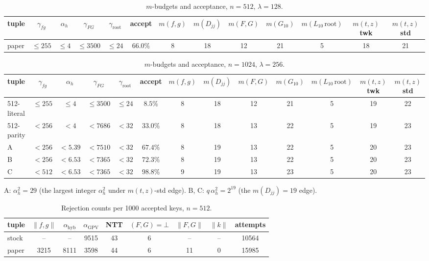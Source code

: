 \documentclass[11pt]{article}
\begin{document}
\begin{table}[h!]
\centering
\caption{$m$-budgets and acceptance, $n=512$, $\lambda=128$.}
\scriptsize\setlength{\tabcolsep}{3pt}
\begin{tabular}{lcccccccccccc}
\toprule
tuple & $\gamma_{fg}$ & $\alpha_h$ & $\gamma_{FG}$ & $\gamma_{\mathrm{root}}$
 & accept
 & $m(f{,}g)$ & $m(D_{jj})$ & $m(F{,}G)$ & $m(G_{10})$
 & $m(L_{10}\,\mathrm{root})$ & $m(t{,}z)$ twk & $m(t{,}z)$ std \\
\midrule
paper & ${\le}255$ & ${\le}4$ & ${\le}3500$ & ${\le}24$ & $66.0\%$
 & 8 & 18 & 12 & 21 & 5 & 18 & 21 \\
\bottomrule
\end{tabular}
\end{table}

\begin{table}[h!]
\centering
\caption{$m$-budgets and acceptance, $n=1024$, $\lambda=256$.}
\scriptsize\setlength{\tabcolsep}{2.5pt}
\begin{tabular}{lcccccccccccc}
\toprule
tuple & $\gamma_{fg}$ & $\alpha_h$ & $\gamma_{FG}$ & $\gamma_{\mathrm{root}}$
 & accept
 & $m(f{,}g)$ & $m(D_{jj})$ & $m(F{,}G)$ & $m(G_{10})$
 & $m(L_{10}\,\mathrm{root})$ & $m(t{,}z)$ twk & $m(t{,}z)$ std \\
\midrule
512-literal & ${\le}255$ & ${\le}4$ & ${\le}3500$ & ${\le}24$ & $8.5\%$ 
 & 8 & 18 & 12 & 21 & 5 & 19 & 22 \\
512-parity & ${<}256$ & ${<}4$ & ${<}7686$ & ${<}32$ & $33.0\%$
 & 8 & 18 & 13 & 22 & 5 & 19 & 23 \\
A          & ${<}256$ & ${<}5.39$ & ${<}7510$ & ${<}32$ & $67.4\%$
 & 8 & 19 & 13 & 22 & 5 & 20 & 23 \\
B          & ${<}256$ & ${<}6.53$ & ${<}7365$ & ${<}32$ & $72.3\%$
 & 8 & 19 & 13 & 22 & 5 & 20 & 23 \\
C          & ${<}512$ & ${<}6.53$ & ${<}7365$ & ${<}32$ & $98.8\%$
 & 9 & 19 & 13 & 23 & 5 & 20 & 23 \\
\bottomrule
\end{tabular}

\vspace{4pt}
{\footnotesize A: $\alpha_h^2 = 29$ (the largest integer $\alpha_h^2$ under
$m(t{,}z)$-std edge). \quad
B, C: $q\,\alpha_h^2 = 2^{19}$ (the $m(D_{jj}) = 19$ edge).}
\end{table}

\begin{table}[h!]
\centering
\caption{Rejection counts per 1000 accepted keys, $n=512$.}
\footnotesize\setlength{\tabcolsep}{5pt}
\begin{tabular}{lcccccccc}
\toprule
tuple & $\|f{,}g\|$ & $\alpha_{\mathrm{hyb}}$ & $\alpha_{\mathrm{GPV}}$
 & NTT & $(F{,}G)=\bot$ & $\|F{,}G\|$ & $\|k\|$ & attempts \\
\midrule
stock & --   & --   & 9515 & 43 & 6 & -- & -- & 10564 \\
paper & 3215 & 8111 & 3598 & 44 & 6 & 11 & 0  & 15985 \\
\bottomrule
\end{tabular}
\end{table}
\end{document}
